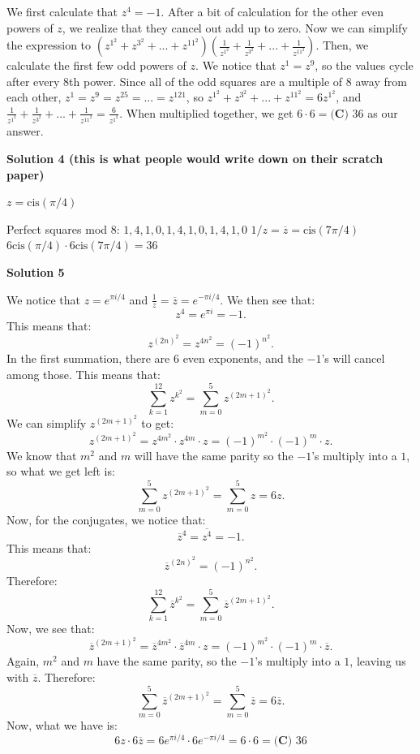 \begin{enumerate}
We first calculate that $z^4 = -1$. After a bit of calculation for the other even powers of $z$, we realize that they cancel out add up to zero. Now we can simplify the expression to $\left(z^{1^2} + z^{3^2} + ... + z^{11^2}\right)\left(\frac{1}{z^{1^2}} + \frac{1}{z^{3^2}} + ... + \frac{1}{z^{11^2}}\right)$. Then, we calculate the first few odd powers of $z$. We notice that $z^1 = z^9$, so the values cycle after every 8th power. Since all of the odd squares are a multiple of $8$ away from each other, $z^1 = z^9 = z^{25} = ... = z^{121}$, so $z^{1^2} + z^{3^2} + ... + z^{11^2} = 6z^{1^2}$, and $\frac{1}{z^{1^2}} + \frac{1}{z^{3^2}} + ... + \frac{1}{z^{11^2}} = \frac{6}{z^{1^2}}$. When multiplied together, we get $6 \cdot 6 = \boxed{\textbf{(C) } 36}$ as our answer.

 



\textbf{Solution 4 (this is what people would write down on their scratch paper)}

$z=\mathrm{cis }(\pi/4)$

 Perfect squares mod 8: $1,4,1,0,1,4,1,0,1,4,1,0$
$1/z=\overline{z}=\mathrm{cis }(7\pi/4)$
$6\mathrm{cis }(\pi/4)\cdot 6\mathrm{cis }(7\pi/4)=\boxed{36}$




\textbf{Solution 5}

We notice that $z = e^{\pi i/4}$ and $\frac1z = \overline{z} = e^{-\pi i/4}$. We then see that: 
 \[z^4 = e^{\pi i} = -1.\] This means that: 
 \[z^{(2n)^2} = z^{4n^2} = (-1)^{n^2}.\] In the first summation, there are $6$ even exponents, and the $-1$'s will cancel among those. This means that: 
 \[\sum_{k=1}^{12} z^{k^2} = \sum_{m=0}^5 z^{(2m+1)^2}.\] We can simplify $z^{(2m+1)^2}$ to get: 
 \[z^{(2m+1)^2} = z^{4m^2} \cdot z^{4m} \cdot z = (-1)^{m^2} \cdot (-1)^{m} \cdot z.\] We know that $m^2$ and $m$ will have the same parity so the $-1$'s multiply into a $1$, so what we get left is: 
 \[\sum_{m=0}^5 z^{(2m+1)^2} = \sum_{m=0}^5 z = 6z.\] Now, for the conjugates, we notice that: 
 \[\overline{z}^4 = \overline{z^4} = -1.\] This means that: 
 \[\overline{z}^{(2n)^2} = (-1)^{n^2}.\] Therefore: 
 \[\sum_{k=1}^{12}\overline{z}^{k^2} = \sum_{m=0}^5 \overline{z}^{(2m+1)^2}.\] Now, we see that: 
 \[\overline{z}^{(2m+1)^2} = \overline{z}^{4m^2} \cdot \overline{z}^{4m} \cdot z = (-1)^{m^2} \cdot (-1)^{m} \cdot \overline{z}.\] Again, $m^2$ and $m$ have the same parity, so the $-1$'s multiply into a $1$, leaving us with $\overline{z}$. Therefore: 
 \[\sum_{m=0}^5 \overline{z}^{(2m+1)^2} = \sum_{m=0}^5 \overline{z} = 6\overline{z}.\] Now, what we have is: 
 \[6z \cdot 6\overline{z} = 6e^{\pi i/4} \cdot 6e^{-\pi i/4} = 6 \cdot 6 = \boxed{\textbf{(C) }36}\] 


\end{enumerate}

